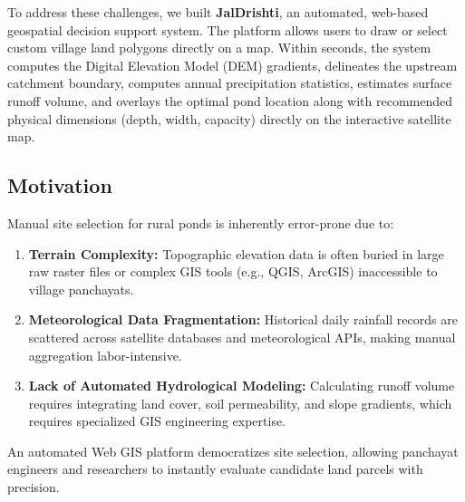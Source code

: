 \documentclass[11pt,a4paper]{article}
\begin{document}
To address these challenges, we built \textbf{JalDrishti}, an automated, web-based geospatial decision support system. The platform allows users to draw or select custom village land polygons directly on a map. Within seconds, the system computes the Digital Elevation Model (DEM) gradients, delineates the upstream catchment boundary, computes annual precipitation statistics, estimates surface runoff volume, and overlays the optimal pond location along with recommended physical dimensions (depth, width, capacity) directly on the interactive satellite map.

\subsection{Motivation}
Manual site selection for rural ponds is inherently error-prone due to:
\begin{enumerate}
    \item \textbf{Terrain Complexity:} Topographic elevation data is often buried in large raw raster files or complex GIS tools (e.g., QGIS, ArcGIS) inaccessible to village panchayats.
    \item \textbf{Meteorological Data Fragmentation:} Historical daily rainfall records are scattered across satellite databases and meteorological APIs, making manual aggregation labor-intensive.
    \item \textbf{Lack of Automated Hydrological Modeling:} Calculating runoff volume requires integrating land cover, soil permeability, and slope gradients, which requires specialized GIS engineering expertise.
\end{enumerate}
An automated Web GIS platform democratizes site selection, allowing panchayat engineers and researchers to instantly evaluate candidate land parcels with precision.
\end{document}
